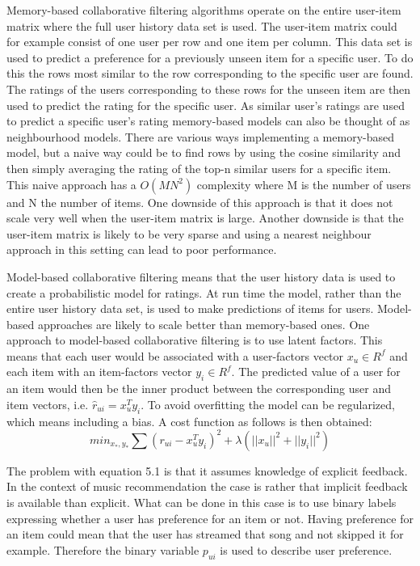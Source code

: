 \documentclass[a4paper,11pt]{kth-mag}
\begin{document}
Memory-based collaborative filtering algorithms operate on the entire user-item matrix where the full user history data set is used. The user-item matrix could for example consist of one user per row and one item per column. This data set is used to predict a preference for a previously unseen item for a specific user. To do this the rows most similar to the row corresponding to the specific user are found. The ratings of the users corresponding to these rows for the unseen item are then used to predict the rating for the specific user. As similar user's ratings are used to predict a specific user's rating memory-based models can also be thought of as neighbourhood models\cite{hu2008collaborative}. There are various ways implementing a memory-based model, but a naive way could be to find rows by using the cosine similarity and then simply averaging the rating of the top-n similar users for a specific item. This naive approach has a $O(MN^2)$ complexity where M is the number of users and N the number of items. One downside of this approach is that it does not scale very well when the user-item matrix is large. Another downside is that the user-item matrix is likely to be very sparse and using a nearest neighbour approach in this setting can lead to poor performance\cite{sarwar2001item}\cite{su2009survey}.

Model-based collaborative filtering means that the user history data is used to create a probabilistic model for ratings. At run time the model, rather than the entire user history data set, is used to make predictions of items for users. Model-based approaches are likely to scale better than memory-based ones\cite{sarwar2001item}. One approach to model-based collaborative filtering is to use latent factors. This means that each user would be associated with a user-factors vector $x_u \in R^f$ and each item with an item-factors vector $y_i \in R^f$. The predicted value of a user for an item would then be the inner product between the corresponding user and item vectors, i.e. $\hat{r}_{ui} = x_u^T y_i$. To avoid overfitting the model can be regularized, which means including a bias. A cost function as follows is then obtained: 
\begin{equation}
min_{x_*,y_*} \sum (r_{ui} - x_u^Ty_i)^2 +  \lambda(||x_u||^2 + ||y_i||^2)
\end{equation}

The problem with equation 5.1 is that it assumes knowledge of explicit feedback. In the context of music recommendation the case is rather that implicit feedback is available than explicit. What can be done in this case is to use binary labels expressing whether a user has preference for an item or not. Having preference for an item could mean that the user has streamed that song and not skipped it for example. Therefore the binary variable $p_{ui}$ is used to describe user preference.
\end{document}
